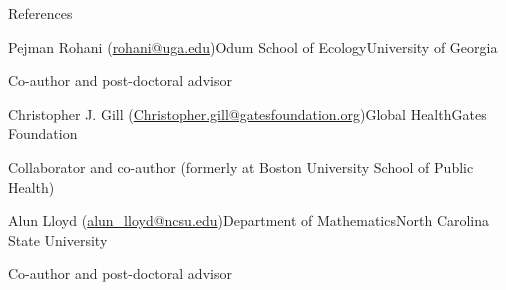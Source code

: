 \documentclass{resume} %
\begin{document}
\begin{rSection}{References}
\begin{rSubsection}{Pejman Rohani (\url{rohani@uga.edu})}{}{Odum School of Ecology}{University of Georgia}
\item Co-author and post-doctoral advisor
\end{rSubsection}
\begin{rSubsection}{Christopher J. Gill (\url{Christopher.gill@gatesfoundation.org})}{}{Global Health}{Gates Foundation}
\item Collaborator and co-author (formerly at Boston University School of Public Health)
\end{rSubsection}
\begin{rSubsection}{Alun Lloyd (\url{alun\_lloyd@ncsu.edu})}{}{Department of Mathematics}{North Carolina State University}
\item Co-author and post-doctoral advisor
\end{rSubsection}
\end{rSection}
\end{document}
